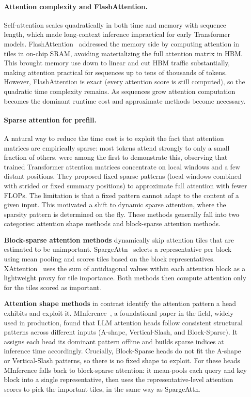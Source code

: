 \paragraph{Attention complexity and FlashAttention.}
Self-attention scales quadratically in both time and memory with sequence length, which made long-context inference impractical for early Transformer models.
FlashAttention~\citep{dao2022flashattention} addressed the memory side by computing attention in tiles in on-chip SRAM, avoiding materializing the full attention matrix in HBM.
This brought memory use down to linear and cut HBM traffic substantially, making attention practical for sequences up to tens of thousands of tokens.
However, FlashAttention is exact (every attention score is still computed), so the quadratic time complexity remains.
As sequences grow attention computation becomes the dominant runtime cost and approximate methods become necessary.

\paragraph{Sparse attention for prefill.}
A natural way to reduce the time cost is to exploit the fact that attention matrices are empirically sparse: most tokens attend strongly to only a small fraction of others.
\citet{child2019generating} were among the first to demonstrate this, observing that trained Transformer attention matrices concentrate on local windows and a few distant positions.
They proposed fixed sparse patterns (local windows combined with strided or fixed summary positions) to approximate full attention with fewer FLOPs.
The limitation is that a fixed pattern cannot adapt to the content of a given input. This motivated a shift to dynamic sparse attention, where the sparsity pattern is determined on the fly. These methods generally fall into two categories: attention shape methods and block-sparse attention methods.

\textbf{Block-sparse attention methods} dynamically skip attention tiles that are estimated to be unimportant. SpargeAttn~\citep{zhang2025spargeattn} selects a representative per block using mean pooling and scores tiles based on the block representatives. XAttention~\citep{xu2025xattention} uses the sum of antidiagonal values within each attention block as a lightweight proxy for tile importance. Both methods then compute attention only for the tiles scored as important.

\textbf{Attention shape methods} in contrast identify the attention pattern a head exhibits and exploit it. MInference~\citep{jiang2024minference}, a foundational paper in the field, widely used in production, found that LLM attention heads follow consistent structural patterns across different inputs (A-shape, Vertical-Slash, and Block-Sparse). It assigns each head its dominant pattern offline and builds sparse indices at inference time accordingly. Crucially, Block-Sparse heads do not fit the A-shape or Vertical-Slash patterns, so there is no fixed shape to exploit. For these heads MInference falls back to block-sparse attention: it mean-pools each query and key block into a single representative, then uses the representative-level attention scores to pick the important tiles, in the same way as SpargeAttn.

